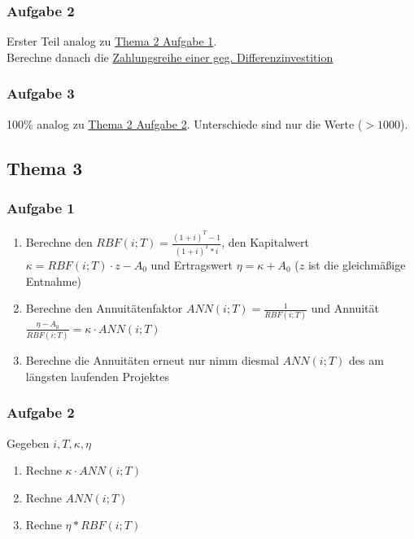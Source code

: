 \documentclass[12pt]{article}
\begin{document}
		\subsubsection*{Aufgabe 2}\label{Thema2Aufgabe2}
		Erster Teil analog zu \hyperref[Thema2Aufgabe1]{Thema 2 Aufgabe 1}. \\
		Berechne danach die \hyperref[ZahlungsreiheEinerDifferenzinvestition]{Zahlungsreihe einer geg. Differenzinvestition}
		\subsubsection*{Aufgabe 3}
		100\% analog zu \hyperref[Thema2Aufgabe2]{Thema 2 Aufgabe 2}. Unterschiede sind nur die Werte ($> 1000$).
	\subsection*{Thema 3}
		\subsubsection*{Aufgabe 1}
		\begin{enumerate}
			\item Berechne den $RBF(i;T)=\frac{(1+i)^T-1}{(1+i)^T*i}$, den Kapitalwert $\kappa=RBF(i;T)\cdot z -A_0$ und Ertragswert $\eta = \kappa + A_0$ ($z$ ist die gleichmäßige Entnahme)
			\item Berechne den Annuitätenfaktor $ANN(i;T)=\frac{1}{RBF(i;T)}$ und Annuität $\frac{\eta-A_0}{RBF(i;T)} = \kappa\cdot ANN(i;T)$
			\item Berechne die Annuitäten erneut nur nimm diesmal $ANN(i;T)$ des am längsten laufenden Projektes
		\end{enumerate}
		\subsubsection*{Aufgabe 2}
		Gegeben $i, T, \kappa, \eta$
		\begin{enumerate}[label=\alph*)]
			\item Rechne $\kappa \cdot ANN(i;T)$
			\item Rechne $ANN(i;T)$
			\item Rechne $\eta*RBF(i;T)$
		\end{enumerate}
\end{document}
